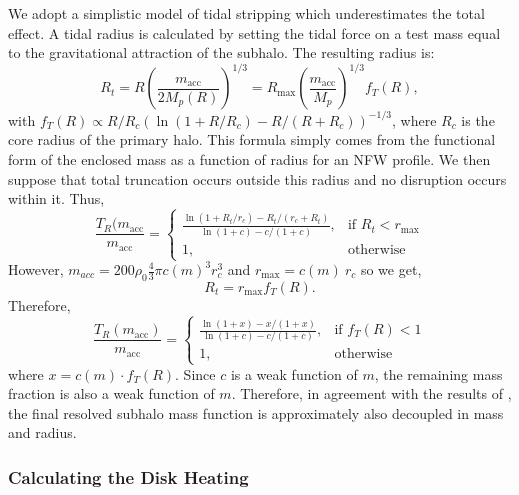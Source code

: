 \documentclass[usenatbib]{mnras}
\begin{document}
We adopt a simplistic model of tidal stripping which underestimates the total effect. A tidal radius is calculated by setting the tidal force on a test mass equal to the gravitational attraction of the subhalo. The resulting radius is:
\begin{equation}
R_t = R \left(\frac{m_{\text{acc}}}{2M_p(R)}\right)^{1/3} =  R_{\text{max}} \left(\frac{m_{\text{acc}}}{M_p}\right)^{1/3} f_T(R), 
\end{equation} 
with $f_T(R) \propto R/R_c(\ln(1+R/R_c) - R/(R+R_c))^{-1/3}$, where $R_c$ is the core radius of the primary halo. This formula simply comes from the functional form of the enclosed mass as a function of radius for an NFW profile. We then suppose that total truncation occurs outside this radius and no disruption occurs within it. Thus,
\begin{equation}
\frac{T_R(m_{\text{acc}}}{m_{\text{acc}}} = 
\begin{cases}
\frac{\ln{(1+R_t/r_c)} - R_t/(r_c+R_t)}{\ln{(1+c)} - c/(1+c)},
& \text{if } R_t < r_{\text{max}}
\\
    1,              & \text{otherwise}
\end{cases}
\end{equation} 
However, $m_{acc} = 200 \rho_0 \frac{4}{3} \pi c(m)^3 r_c^3$ and $r_{\text{max}} = c(m) \: r_{c}$ so we get,
\begin{equation}
R_t = r_{\text{max}} f_T(R).
\end{equation}
Therefore,
\begin{equation} \label{trunc}
\frac{T_R(m_{\text{acc}})}{m_{\text{acc}}} =
\begin{cases}
\frac{\ln{(1 + x)} - x/(1 + x)}{\ln{(1+c)} - c/(1+c)},& \text{if } f_T(R) < 1
\\
1, & \text{otherwise}
\end{cases}
\end{equation} 
where $x = c(m) \cdot f_T(R)$. Since $c$ is a weak function of $m$, the remaining mass fraction is also a weak function of $m$. Therefore, in agreement with the results of \citet{unified_model}, the final resolved subhalo mass function is approximately also decoupled in mass and radius. 

\subsubsection{Calculating the Disk Heating}
\end{document}
